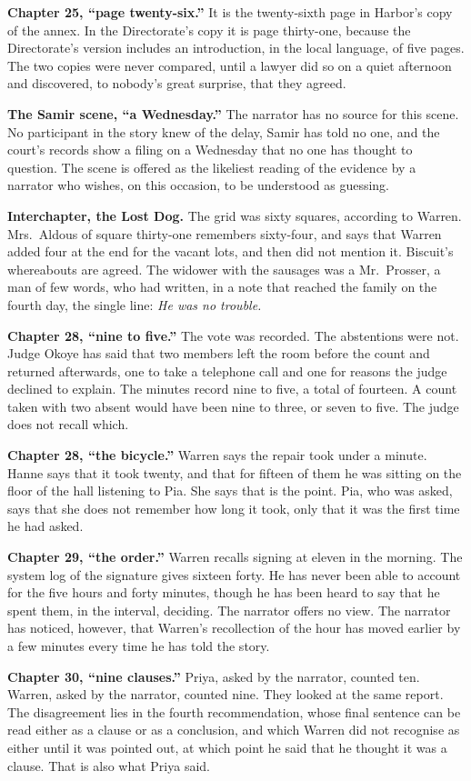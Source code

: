 {\textbf{Chapter 25, ``page twenty-six.''} It is the twenty-sixth page in Harbor's copy of the annex. In the Directorate's copy it is page thirty-one, because the Directorate's version includes an introduction, in the local language, of five pages. The two copies were never compared, until a lawyer did so on a quiet afternoon and discovered, to nobody's great surprise, that they agreed.

\textbf{The Samir scene, ``a Wednesday.''} The narrator has no source for this scene. No participant in the story knew of the delay, Samir has told no one, and the court's records show a filing on a Wednesday that no one has thought to question. The scene is offered as the likeliest reading of the evidence by a narrator who wishes, on this occasion, to be understood as guessing.

\textbf{Interchapter, the Lost Dog.} The grid was sixty squares, according to Warren. Mrs.~Aldous of square thirty-one remembers sixty-four, and says that Warren added four at the end for the vacant lots, and then did not mention it. Biscuit's whereabouts are agreed. The widower with the sausages was a Mr.~Prosser, a man of few words, who had written, in a note that reached the family on the fourth day, the single line: \emph{He was no trouble.}

\textbf{Chapter 28, ``nine to five.''} The vote was recorded. The abstentions were not. Judge Okoye has said that two members left the room before the count and returned afterwards, one to take a telephone call and one for reasons the judge declined to explain. The minutes record nine to five, a total of fourteen. A count taken with two absent would have been nine to three, or seven to five. The judge does not recall which.

\textbf{Chapter 28, ``the bicycle.''} Warren says the repair took under a minute. Hanne says that it took twenty, and that for fifteen of them he was sitting on the floor of the hall listening to Pia. She says that is the point. Pia, who was asked, says that she does not remember how long it took, only that it was the first time he had asked.

\textbf{Chapter 29, ``the order.''} Warren recalls signing at eleven in the morning. The system log of the signature gives sixteen forty. He has never been able to account for the five hours and forty minutes, though he has been heard to say that he spent them, in the interval, deciding. The narrator offers no view. The narrator has noticed, however, that Warren's recollection of the hour has moved earlier by a few minutes every time he has told the story.

\textbf{Chapter 30, ``nine clauses.''} Priya, asked by the narrator, counted ten. Warren, asked by the narrator, counted nine. They looked at the same report. The disagreement lies in the fourth recommendation, whose final sentence can be read either as a clause or as a conclusion, and which Warren did not recognise as either until it was pointed out, at which point he said that he thought it was a clause. That is also what Priya said.

}

